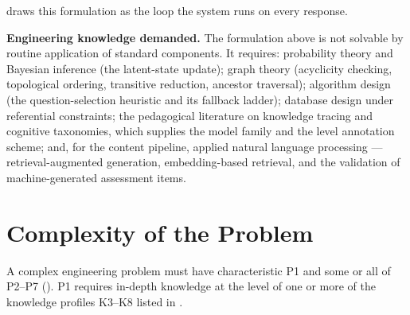  draws this formulation as the loop the system runs on
every response.



\noindent\textbf{Engineering knowledge demanded.} The formulation above is not
solvable by routine application of standard components. It requires: probability
theory and Bayesian inference (the latent-state update); graph theory (acyclicity
checking, topological ordering, transitive reduction, ancestor traversal);
algorithm design (the question-selection heuristic and its fallback ladder);
database design under referential constraints; the pedagogical literature on
knowledge tracing and cognitive taxonomies, which supplies the model family and
the level annotation scheme; and, for the content pipeline, applied natural
language processing --- retrieval-augmented generation, embedding-based
retrieval, and the validation of machine-generated assessment items.

\section{Complexity of the Problem}
\label{sec:complexity}
A complex engineering problem must have characteristic P1 and some or all of
P2--P7 (). P1 requires in-depth knowledge at the level
of one or more of the knowledge profiles K3--K8 listed in
.

